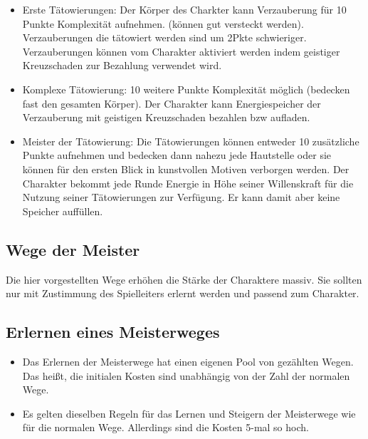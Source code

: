 \documentclass{article}
\begin{document}
\begin{itemize}
\item Erste Tätowierungen: Der Körper des Charkter kann Verzauberung für 10 Punkte Komplexität aufnehmen. (können gut versteckt werden). Verzauberungen die tätowiert werden sind um 2Pkte schwieriger. Verzauberungen können vom Charakter aktiviert werden indem geistiger Kreuzschaden zur Bezahlung verwendet wird.
\item Komplexe Tätowierung: 10 weitere Punkte Komplexität möglich (bedecken fast den gesamten Körper). Der Charakter kann Energiespeicher der Verzauberung mit geistigen Kreuzschaden bezahlen bzw aufladen.
\item Meister der Tätowierung: Die Tätowierungen können entweder 10 zusätzliche Punkte aufnehmen und bedecken dann nahezu jede Hautstelle oder sie können für den ersten Blick in kunstvollen Motiven verborgen werden. Der Charakter bekommt jede Runde Energie in Höhe seiner Willenskraft für die Nutzung seiner Tätowierungen zur Verfügung. Er kann damit aber keine Speicher auffüllen.
\end{itemize}

\begin{center}
\section{Wege der Meister}
\end{center}

Die hier vorgestellten Wege erhöhen die Stärke der Charaktere massiv. Sie sollten nur mit Zustimmung des Spielleiters
erlernt werden und passend zum Charakter.

\begin{center}
\subsection{Erlernen eines Meisterweges}
\end{center}

\begin{itemize}
\item Das Erlernen der Meisterwege hat einen eigenen Pool von gezählten Wegen. Das heißt, die initialen Kosten sind unabhängig von der Zahl der normalen Wege.
\item Es gelten dieselben Regeln für das Lernen und Steigern der Meisterwege wie für die normalen Wege. Allerdings sind die Kosten 5-mal so hoch.
\end{itemize}
\end{document}
